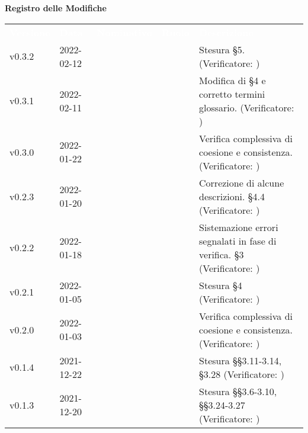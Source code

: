 
{\LARGE{\textbf{Registro delle Modifiche}}} \\
\renewcommand{\arraystretch}{1.5}
\begin{longtable}{ m{}<{\centering}  m{}<{\centering}  m{}<{\centering}  m{}<{\centering}  m{}<{\centering} }
	\rowcolor{darkblue}
	\textcolor{white}{\textbf{Versione}} &\textcolor{white}{\textbf{Data}}& \textcolor{white}{\textbf{Nominativo}} & \textcolor{white}{\textbf{Ruolo}}&\textcolor{white}{\textbf{Descrizione}}\\ 
	v0.3.2 & 2022-02-12 & \FP{} & \AN{} & Stesura §5. (Verificatore: \textit{\MG})\\

	v0.3.1 & 2022-02-11 & \GC{} & \AN{} & Modifica di \S{}4 e corretto termini glossario. (Verificatore: \textit{\MG})\\
	
	v0.3.0 & 2022-01-22 & \GC{} & \AN{} & Verifica complessiva di coesione e consistenza. (Verificatore: \textit{\MG})\\		
	
	v0.2.3 & 2022-01-20 & \GC{} & \AN{} & Correzione di alcune descrizioni. \S{}4.4 (Verificatore: \textit{\MG})\\

	v0.2.2 & 2022-01-18 & \GC & \AN & Sistemazione errori segnalati in fase di verifica. \S{}3 (Verificatore: \textit{\PV}) \\

	v0.2.1 & 2022-01-05 & \GC{} & \AN{} & Stesura §4 (Verificatore: \textit{\MG})\\	

	v0.2.0 & 2022-01-03 & \LW{} & \VE{} & Verifica complessiva di coesione e consistenza. (Verificatore: \textit{\PV})\\	

	v0.1.4 & 2021-12-22 & \LW{} & \AN{} & Stesura §§3.11-3.14, §3.28 (Verificatore: \textit{\PV})\\	

	v0.1.3 & 2021-12-20 & \FP{} & \AN{} & Stesura §§3.6-3.10, §§3.24-3.27 (Verificatore: \textit{\PV})\\	
	

\end{longtable}
